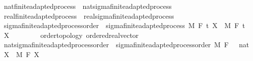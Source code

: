 \begin{isabellebody}
\isanewline
{}\isamarkupfalse%
\ nat{\isacharunderscore}{\kern0pt}finite{\isacharunderscore}{\kern0pt}adapted{\isacharunderscore}{\kern0pt}process\ {\isasymsubseteq}\ nat{\isacharunderscore}{\kern0pt}sigma{\isacharunderscore}{\kern0pt}finite{\isacharunderscore}{\kern0pt}adapted{\isacharunderscore}{\kern0pt}process%
\isadelimproof
\ %
\endisadelimproof
%
\isatagproof
\isacommand{{\isachardot}{\kern0pt}{\isachardot}{\kern0pt}}\isamarkupfalse%
%
\endisatagproof
{\isafoldproof}%
%
\isadelimproof
%
\endisadelimproof
\isanewline
{}\isamarkupfalse%
\ real{\isacharunderscore}{\kern0pt}finite{\isacharunderscore}{\kern0pt}adapted{\isacharunderscore}{\kern0pt}process\ {\isasymsubseteq}\ real{\isacharunderscore}{\kern0pt}sigma{\isacharunderscore}{\kern0pt}finite{\isacharunderscore}{\kern0pt}adapted{\isacharunderscore}{\kern0pt}process%
\isadelimproof
\ %
\endisadelimproof
%
\isatagproof
\isacommand{{\isachardot}{\kern0pt}{\isachardot}{\kern0pt}}\isamarkupfalse%
%
\endisatagproof
{\isafoldproof}%
%
\isadelimproof
%
\endisadelimproof
\isanewline
\isanewline
\isanewline
\isanewline
{}\isamarkupfalse%
\ sigma{\isacharunderscore}{\kern0pt}finite{\isacharunderscore}{\kern0pt}adapted{\isacharunderscore}{\kern0pt}process{\isacharunderscore}{\kern0pt}order\ {\isacharequal}{\kern0pt}\ sigma{\isacharunderscore}{\kern0pt}finite{\isacharunderscore}{\kern0pt}adapted{\isacharunderscore}{\kern0pt}process\ M\ F\ t\ X\ \ M\ F\ t\ \ X\ {\isacharcolon}{\kern0pt}{\isacharcolon}{\kern0pt}\ {\isachardoublequoteopen}{\isacharunderscore}{\kern0pt}\ \ {\isasymRightarrow}\ {\isacharunderscore}{\kern0pt}\ {\isasymRightarrow}\ {\isacharunderscore}{\kern0pt}\ {\isacharcolon}{\kern0pt}{\isacharcolon}{\kern0pt}\ {\isacharbraceleft}{\kern0pt}order{\isacharunderscore}{\kern0pt}topology{\isacharcomma}{\kern0pt}\ ordered{\isacharunderscore}{\kern0pt}real{\isacharunderscore}{\kern0pt}vector{\isacharbraceright}{\kern0pt}{\isachardoublequoteclose}\ \isanewline
\isanewline
{}\isamarkupfalse%
\ nat{\isacharunderscore}{\kern0pt}sigma{\isacharunderscore}{\kern0pt}finite{\isacharunderscore}{\kern0pt}adapted{\isacharunderscore}{\kern0pt}process{\isacharunderscore}{\kern0pt}order\ {\isacharequal}{\kern0pt}\ sigma{\isacharunderscore}{\kern0pt}finite{\isacharunderscore}{\kern0pt}adapted{\isacharunderscore}{\kern0pt}process{\isacharunderscore}{\kern0pt}order\ M\ F\ {\isachardoublequoteopen}{}\ {\isacharcolon}{\kern0pt}{\isacharcolon}{\kern0pt}\ nat{\isachardoublequoteclose}\ X\ \ M\ F\ X\isanewline

\end{isabellebody}
